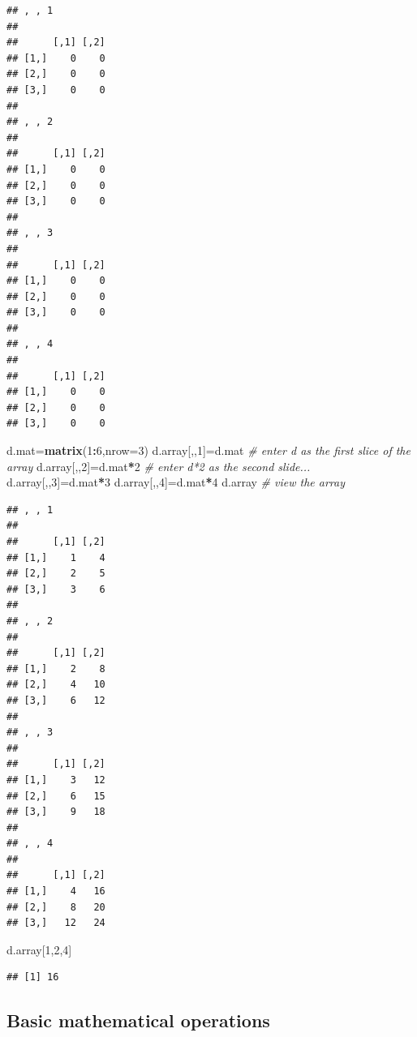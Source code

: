\documentclass[]{article}
\newenvironment{Shaded}{\begin{snugshade}}{\end{snugshade}}
\newcommand{\KeywordTok}[1]{\textcolor[rgb]{0.13,0.29,0.53}{\textbf{#1}}}
\newcommand{\DataTypeTok}[1]{\textcolor[rgb]{0.13,0.29,0.53}{#1}}
\newcommand{\DecValTok}[1]{\textcolor[rgb]{0.00,0.00,0.81}{#1}}
\newcommand{\CommentTok}[1]{\textcolor[rgb]{0.56,0.35,0.01}{\textit{#1}}}
\newcommand{\OperatorTok}[1]{\textcolor[rgb]{0.81,0.36,0.00}{\textbf{#1}}}
\newcommand{\NormalTok}[1]{#1}
\begin{document}
\begin{verbatim}
## , , 1
## 
##      [,1] [,2]
## [1,]    0    0
## [2,]    0    0
## [3,]    0    0
## 
## , , 2
## 
##      [,1] [,2]
## [1,]    0    0
## [2,]    0    0
## [3,]    0    0
## 
## , , 3
## 
##      [,1] [,2]
## [1,]    0    0
## [2,]    0    0
## [3,]    0    0
## 
## , , 4
## 
##      [,1] [,2]
## [1,]    0    0
## [2,]    0    0
## [3,]    0    0
\end{verbatim}

\begin{Shaded}
\begin{Highlighting}[]
\NormalTok{d.mat=}\KeywordTok{matrix}\NormalTok{(}\DecValTok{1}\OperatorTok{:}\DecValTok{6}\NormalTok{,}\DataTypeTok{nrow=}\DecValTok{3}\NormalTok{)}
\NormalTok{d.array[,,}\DecValTok{1}\NormalTok{]=d.mat          }\CommentTok{# enter d as the first slice of the array}
\NormalTok{d.array[,,}\DecValTok{2}\NormalTok{]=d.mat}\OperatorTok{*}\DecValTok{2}        \CommentTok{# enter d*2 as the second slide...}
\NormalTok{d.array[,,}\DecValTok{3}\NormalTok{]=d.mat}\OperatorTok{*}\DecValTok{3}
\NormalTok{d.array[,,}\DecValTok{4}\NormalTok{]=d.mat}\OperatorTok{*}\DecValTok{4}
\NormalTok{d.array             }\CommentTok{# view the array }
\end{Highlighting}
\end{Shaded}

\begin{verbatim}
## , , 1
## 
##      [,1] [,2]
## [1,]    1    4
## [2,]    2    5
## [3,]    3    6
## 
## , , 2
## 
##      [,1] [,2]
## [1,]    2    8
## [2,]    4   10
## [3,]    6   12
## 
## , , 3
## 
##      [,1] [,2]
## [1,]    3   12
## [2,]    6   15
## [3,]    9   18
## 
## , , 4
## 
##      [,1] [,2]
## [1,]    4   16
## [2,]    8   20
## [3,]   12   24
\end{verbatim}

\begin{Shaded}
\begin{Highlighting}[]
\NormalTok{d.array[}\DecValTok{1}\NormalTok{,}\DecValTok{2}\NormalTok{,}\DecValTok{4}\NormalTok{]}
\end{Highlighting}
\end{Shaded}

\begin{verbatim}
## [1] 16
\end{verbatim}

\subsection{Basic mathematical
operations}\label{basic-mathematical-operations}
\end{document}
